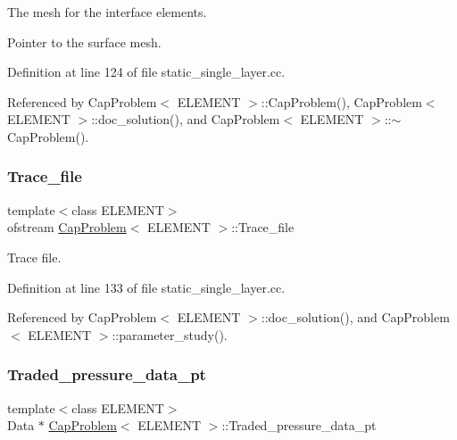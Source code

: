 The mesh for the interface elements. 

Pointer to the surface mesh. 

Definition at line 124 of file static\+\_\+single\+\_\+layer.\+cc.



Referenced by Cap\+Problem$<$ E\+L\+E\+M\+E\+N\+T $>$\+::\+Cap\+Problem(), Cap\+Problem$<$ E\+L\+E\+M\+E\+N\+T $>$\+::doc\+\_\+solution(), and Cap\+Problem$<$ E\+L\+E\+M\+E\+N\+T $>$\+::$\sim$\+Cap\+Problem().

\mbox{\label{classCapProblem_a46ba6cbe3e82a36db8831fdd53d9f3a9}} 
\subsubsection{\texorpdfstring{Trace\+\_\+file}{Trace\_file}}
{\footnotesize\ttfamily template$<$class E\+L\+E\+M\+E\+NT$>$ \\
ofstream \hyperlink{classCapProblem}{Cap\+Problem}$<$ E\+L\+E\+M\+E\+NT $>$\+::Trace\+\_\+file\hspace{0.3cm}{\ttfamily [private]}}



Trace file. 



Definition at line 133 of file static\+\_\+single\+\_\+layer.\+cc.



Referenced by Cap\+Problem$<$ E\+L\+E\+M\+E\+N\+T $>$\+::doc\+\_\+solution(), and Cap\+Problem$<$ E\+L\+E\+M\+E\+N\+T $>$\+::parameter\+\_\+study().

\mbox{\label{classCapProblem_a1ad1a124cb5aa9c1724cbef89e47a35b}} 
\subsubsection{\texorpdfstring{Traded\+\_\+pressure\+\_\+data\+\_\+pt}{Traded\_pressure\_data\_pt}}
{\footnotesize\ttfamily template$<$class E\+L\+E\+M\+E\+NT$>$ \\
Data $\ast$ \hyperlink{classCapProblem}{Cap\+Problem}$<$ E\+L\+E\+M\+E\+NT $>$\+::Traded\+\_\+pressure\+\_\+data\+\_\+pt\hspace{0.3cm}{\ttfamily [private]}}



